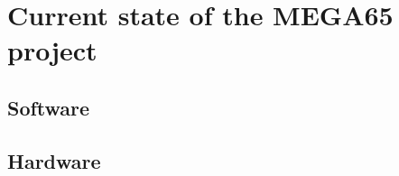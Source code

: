 
\chapter{Current state of the MEGA65 project}
\label{Chapter5}

\section{Software}



\section{Hardware}
